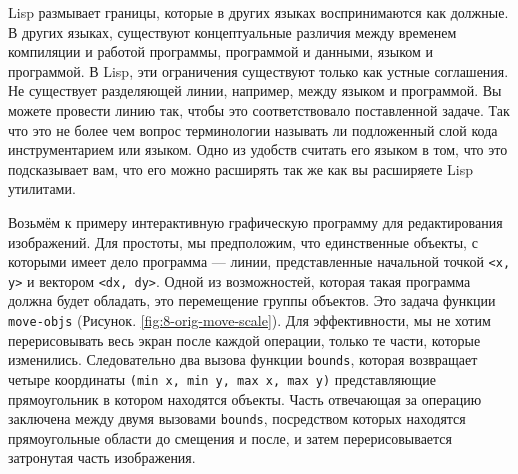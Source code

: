 \documentclass[12pt, a4paper]{article} %
\begin{document}
Lisp размывает границы, которые в других языках воспринимаются как должные. В других языках, существуют концептуальные различия между временем компиляции и работой программы, программой и данными, языком и программой. В Lisp, эти ограничения существуют только как устные соглашения. Не существует разделяющей линии, например, между языком и программой. Вы можете провести линию так, чтобы это соответствовало поставленной задаче. Так что это не более чем вопрос терминологии называть ли подложенный слой кода инструментарием или языком. Одно из удобств считать его языком в том, что это подсказывает вам, что его можно расширять так же как вы расширяете Lisp утилитами.

Возьмём к примеру интерактивную графическую программу для редактирования изображений. Для простоты, мы предположим, что единственные объекты, с которыми имеет дело программа --- линии, представленные начальной точкой \texttt{<x, y>} и вектором \texttt{<dx, dy>}. Одной из возможностей, которая такая программа должна будет обладать, это перемещение группы объектов. Это задача функции \texttt{move-objs} (Рисунок. \ref{fig:8-orig-move-scale}). Для эффективности, мы не хотим перерисовывать весь экран после каждой операции, только те части, которые изменились. Следовательно два вызова функции \texttt{bounds}, которая возвращает четыре координаты \texttt{(min x, min y, max x, max y)} представляющие прямоугольник в котором находятся объекты. Часть отвечающая за операцию заключена между двумя вызовами \texttt{bounds}, посредством которых находятся прямоугольные области до смещения и после, и затем перерисовывается затронутая часть изображения. 
\end{document}
